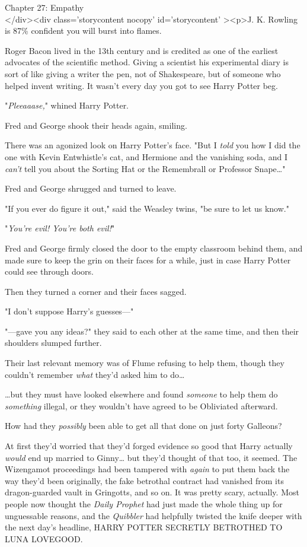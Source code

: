 
Chapter 27: Empathy\\
</div><div  class='storycontent nocopy' id='storycontent' ><p>J. K. Rowling is 
87\% confident you will burst into flames.

Roger Bacon lived in the 13th century and is credited as one of the earliest 
advocates of the scientific method. Giving a scientist his experimental diary 
is sort of like giving a writer the pen, not of Shakespeare, but of someone who 
helped invent writing.
\sbreak
It wasn't every day you got to see Harry Potter beg.

"\emph{Pleeaaase,}" whined Harry Potter.

Fred and George shook their heads again, smiling.

There was an agonized look on Harry Potter's face. "But I \emph{told} you how I 
did the one with Kevin Entwhistle's cat, and Hermione and the vanishing soda, 
and I \emph{can't} tell you about the Sorting Hat or the Remembrall or 
Professor Snape{\ldots}"

Fred and George shrugged and turned to leave.

"If you ever do figure it out," said the Weasley twins, "be sure to let us 
know."

"\emph{You're evil! You're both evil!}"

Fred and George firmly closed the door to the empty classroom behind them, and 
made sure to keep the grin on their faces for a while, just in case Harry 
Potter could see through doors.

Then they turned a corner and their faces sagged.

"I don't suppose Harry's guesses---"

"---gave you any ideas?" they said to each other at the same time, and then 
their shoulders slumped further.

Their last relevant memory was of Flume refusing to help them, though they 
couldn't remember \emph{what} they'd asked him to do{\ldots}

{\ldots}but they must have looked elsewhere and found \emph{someone} to help 
them do \emph{something} illegal, or they wouldn't have agreed to be Obliviated 
afterward.

How had they \emph{possibly} been able to get all that done on just forty 
Galleons?

At first they'd worried that they'd forged evidence so good that Harry actually 
\emph{would} end up married to Ginny{\ldots} but they'd thought of that too, it 
seemed. The Wizengamot proceedings had been tampered with \emph{again} to put 
them back the way they'd been originally, the fake betrothal contract had 
vanished from its dragon-guarded vault in Gringotts, and so on. It was pretty 
scary, actually. Most people now thought the \emph{Daily Prophet} had just made 
the whole thing up for unguessable reasons, and the \emph{Quibbler} had 
helpfully twisted the knife deeper with the next day's headline, HARRY POTTER 
SECRETLY BETROTHED TO LUNA LOVEGOOD.


